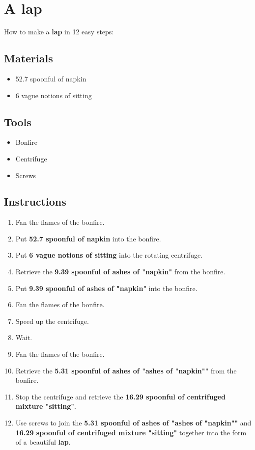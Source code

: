 \documentclass{article}
\begin{document}
\section{A lap}How to make a \textbf{lap} in 12 easy steps:

\subsection{Materials}\begin{itemize}
\item 
52.7 spoonful of napkin
\item 
6 vague notions of sitting
\end{itemize}
\subsection{Tools}\begin{itemize}
\item 
Bonfire
\item 
Centrifuge
\item 
Screws
\end{itemize}
\subsection{Instructions}\begin{enumerate}
\item 
Fan the flames of the bonfire.
\item 
Put \textbf{52.7 spoonful of napkin} into the bonfire.
\item 
Put \textbf{6 vague notions of sitting} into the rotating centrifuge.
\item 
Retrieve the \textbf{9.39 spoonful of ashes of "napkin"} from the bonfire.
\item 
Put \textbf{9.39 spoonful of ashes of "napkin"} into the bonfire.
\item 
Fan the flames of the bonfire.
\item 
Speed up the centrifuge.
\item 
Wait.
\item 
Fan the flames of the bonfire.
\item 
Retrieve the \textbf{5.31 spoonful of ashes of "ashes of "napkin""} from the bonfire.
\item 
Stop the centrifuge and retrieve the \textbf{16.29 spoonful of centrifuged mixture "sitting"}.
\item 
Use screws to join the \textbf{5.31 spoonful of ashes of "ashes of "napkin""} and \textbf{16.29 spoonful of centrifuged mixture "sitting"} together into the form of a beautiful \textbf{lap}.
\end{enumerate}
\newpage
\end{document}
